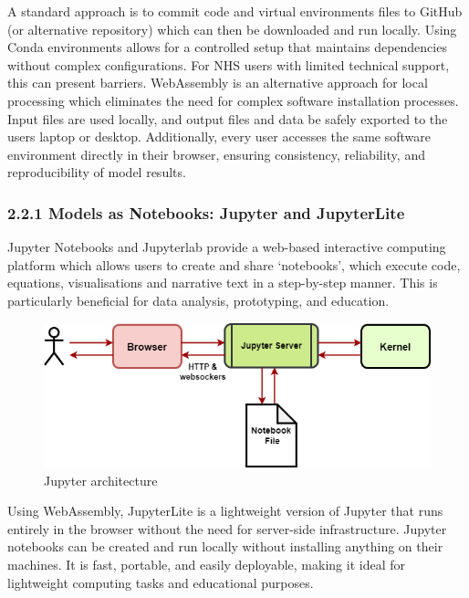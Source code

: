 \documentclass[
  letterpaper,
  DIV=11,
  numbers=noendperiod]{scrreprt}
\begin{document}
A standard approach is to commit code and virtual environments files to
GitHub (or alternative repository) which can then be downloaded and run
locally. Using Conda environments allows for a controlled setup that
maintains dependencies without complex configurations. For NHS users
with limited technical support, this can present barriers. WebAssembly
is an alternative approach for local processing which eliminates the
need for complex software installation processes. Input files are used
locally, and output files and data be safely exported to the users
laptop or desktop. Additionally, every user accesses the same software
environment directly in their browser, ensuring consistency,
reliability, and reproducibility of model results.

\subsubsection{2.2.1 Models as Notebooks: Jupyter and
JupyterLite}\label{models-as-notebooks-jupyter-and-jupyterlite}

Jupyter Notebooks and Jupyterlab provide a web-based interactive
computing platform which allows users to create and share `notebooks',
which execute code, equations, visualisations and narrative text in a
step-by-step manner. This is particularly beneficial for data analysis,
prototyping, and education.

\begin{figure}[H]

{\centering \includegraphics{notebooks/images/Normal_jupyter2.drawio.png}

}

\caption{Jupyter architecture}

\end{figure}%

Using WebAssembly, JupyterLite is a lightweight version of Jupyter that
runs entirely in the browser without the need for server-side
infrastructure. Jupyter notebooks can be created and run locally without
installing anything on their machines. It is fast, portable, and easily
deployable, making it ideal for lightweight computing tasks and
educational purposes.
\end{document}
